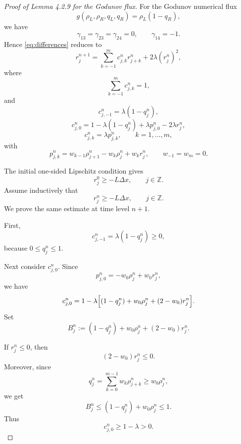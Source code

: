 \begin{proof}[Proof of Lemma 4.2.9 for the Godunov flux]
    For the Godunov numerical flux
    \[
        g(\rho_L,\rho_R,q_L,q_R)=\rho_L(1-q_R),
    \]
    we have
    \[
        \gamma_{13}=\gamma_{23}=\gamma_{24}=0,
        \qquad
        \gamma_{14}=-1.
    \]
    Hence \eqref{eq:differences} reduces to
    \[
        r_j^{n+1}
        =
        \sum_{k=-1}^m c_{j,k}^n r_{j+k}^n
        +2\lambda(r_j^n)^2,
    \]
    where
    \[
        \sum_{k=-1}^m c_{j,k}^n=1,
    \]
    and
    \[
        c_{j,-1}^n=\lambda(1-q_j^n),
    \]
    \[
        c_{j,0}^n
        =
        1-\lambda(1-q_j^n)+\lambda p_{j,0}^n-2\lambda r_j^n,
    \]
    \[
        c_{j,k}^n=\lambda p_{j,k}^n,
        \qquad k=1,\dots,m,
    \]
    with
    \[
        p_{j,k}^n
        =
        w_{k-1}\rho_{j+1}^n-w_k\rho_j^n+w_k r_j^n,
        \qquad
        w_{-1}=w_m=0.
    \]

    The initial one-sided Lipschitz condition gives
    \[
        r_j^0\ge -L\Delta x,
        \qquad j\in\mathbb Z.
    \]
    Assume inductively that
    \[
        r_j^n\ge -L\Delta x,
        \qquad j\in\mathbb Z.
    \]
    We prove the same estimate at time level \(n+1\).

    First,
    \[
        c_{j,-1}^n=\lambda(1-q_j^n)\ge0,
    \]
    because \(0\le q_j^n\le1\).

    Next consider \(c_{j,0}^n\). Since
    \[
        p_{j,0}^n=-w_0\rho_j^n+w_0r_j^n,
    \]
    we have
    \[
        c_{j,0}^n
        =
        1-\lambda\Bigl[
            (1-q_j^n)+w_0\rho_j^n+(2-w_0)r_j^n
            \Bigr].
    \]
    Set
    \[
        B_j^n
        :=
        (1-q_j^n)+w_0\rho_j^n+(2-w_0)r_j^n.
    \]

    If \(r_j^n\le0\), then
    \[
        (2-w_0)r_j^n\le0.
    \]
    Moreover, since
    \[
        q_j^n
        =
        \sum_{k=0}^{m-1}w_k\rho_{j+k}^n
        \ge w_0\rho_j^n,
    \]
    we get
    \[
        B_j^n
        \le
        (1-q_j^n)+w_0\rho_j^n
        \le 1.
    \]
    Thus
    \[
        c_{j,0}^n\ge 1-\lambda>0.
    \]


\end{proof}
